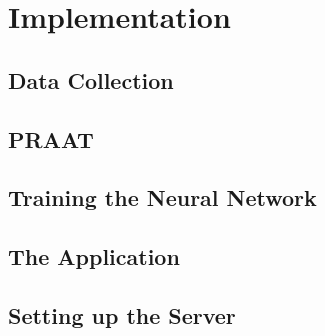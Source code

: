 \chapter{Implementation}
\label{chap:Implementation}


\section{Data Collection}
\label{sec:Data Collection}


\section{PRAAT}
\label{sec:PRAAT}


\section{Training the Neural Network}
\label{sec:Training the Neural Network}


\section{The Application}
\label{sec:The Application}


\section{Setting up the Server}
\label{sec:Setting up the Server}
